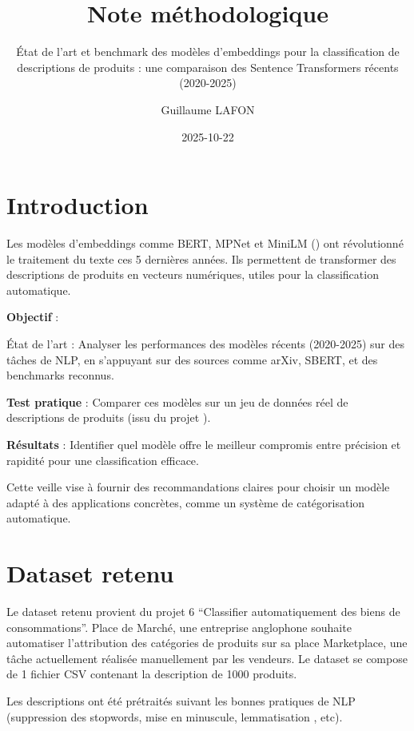 \documentclass[
  french,
  letterpaper,
  DIV=11,
  numbers=noendperiod]{scrartcl}
\title{Note méthodologique}
\subtitle{État de l'art et benchmark des modèles d'embeddings pour la
classification de descriptions de produits : une comparaison des
Sentence Transformers récents (2020-2025)}
\author{Guillaume LAFON}
\date{2025-10-22}
\renewcommand*\contentsname{Table des matières}
\newcommand\contentsname{Table des matières}
\begin{document}
\maketitle

\renewcommand*\contentsname{Table des matières}
{
\hypersetup{linkcolor=}
\setcounter{tocdepth}{3}
\tableofcontents
}

\section{Introduction}\label{introduction}

Les modèles d'embeddings comme BERT, MPNet et MiniLM
(\textcite{sbert_pretrained_models}) ont révolutionné le traitement du
texte ces 5 dernières années. Ils permettent de transformer des
descriptions de produits en vecteurs numériques, utiles pour la
classification automatique.

\textbf{Objectif} :

État de l'art : Analyser les performances des modèles récents
(2020-2025) sur des tâches de NLP, en s'appuyant sur des sources comme
arXiv, SBERT, et des benchmarks reconnus.

\textbf{Test pratique} : Comparer ces modèles sur un jeu de données réel
de descriptions de produits (issu du projet
\textcite{openclassrooms_projet6}).

\textbf{Résultats} : Identifier quel modèle offre le meilleur compromis
entre précision et rapidité pour une classification efficace.

Cette veille vise à fournir des recommandations claires pour choisir un
modèle adapté à des applications concrètes, comme un système de
catégorisation automatique.

\textcite{SUPRIYONO2024100173}
\textcite{naveed2024comprehensiveoverviewlargelanguage}

\section{Dataset retenu}\label{dataset-retenu}

Le dataset retenu provient du projet 6 ``Classifier automatiquement des
biens de consommations''. Place de Marché, une entreprise anglophone
souhaite automatiser l'attribution des catégories de produits sur sa
place Marketplace, une tâche actuellement réalisée manuellement par les
vendeurs. Le dataset se compose de 1 fichier CSV contenant la
description de 1000 produits.

Les descriptions ont été prétraités suivant les bonnes pratiques de NLP
(suppression des stopwords, mise en minuscule, lemmatisation , etc).
\end{document}
